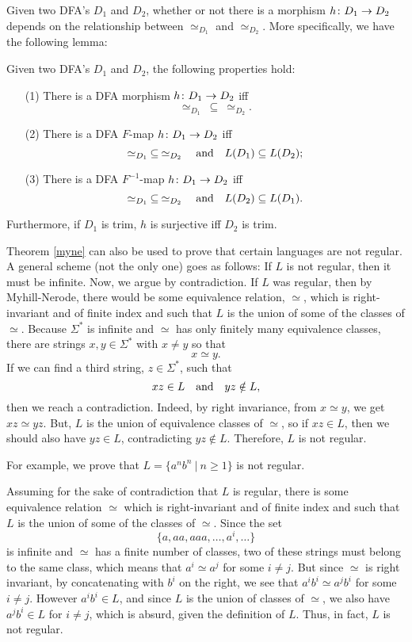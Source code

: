 \medskip
Given two DFA's $D_1$ and $D_2$, whether or not 
there is a morphism $h\colon D_1\rightarrow D_2$
depends on the relationship between
$\simeq_{D_1}$ and $\simeq_{D_2}$.
More specifically, we have the following lemma:

\begin{lemma}
\label{existmorph}
Given two DFA's $D_1$ and $D_2$, the following
properties hold:
\begin{enumerate}
\item[(1)]
There is a DFA morphism $h\colon D_1\rightarrow D_2$
iff 
\[\simeq_{D_1}\>\subseteq\>\simeq_{D_2}.\]
\item[(2)]
There is a DFA $F$-map
$h\colon D_1\rightarrow D_2$ iff
\[\simeq_{D_1}\>\subseteq\> \simeq_{D_2}
\quad\hbox{and}\quad
L(D_1) \subseteq  L(D_2);\]
\item[(3)]
There is a DFA $F^{-1}$-map
$h\colon D_1\rightarrow D_2$ iff
\[\simeq_{D_1}\>\subseteq\> \simeq_{D_2}
\quad\hbox{and}\quad
L(D_2) \subseteq  L(D_1).\]
\end{enumerate}
Furthermore, if $D_1$ is trim, $h$ is surjective iff
$D_2$ is trim.
\end{lemma}


\medskip
Theorem \ref{myne} can also be used to prove that certain
languages are not regular. 
A general scheme (not the only one) goes as follows:
If $L$ is not regular, then it must be infinite. Now, we argue by 
contradiction.  If $L$ was regular, then by Myhill-Nerode,
there would be some equivalence relation, $\simeq$, which is right-invariant
and of finite index and such that $L$ is the union of some of the classes
of $\simeq$. Because $\Sigma^*$ is infinite and $\simeq$
has only finitely many equivalence classes, there are 
strings $x, y\in \Sigma^*$ with $x\not = y$ so that
\[
x \simeq y.
\]
If we can find a third string, $z\in\Sigma^*$, such that
\[
xz\in L\quad\hbox{and}\quad yz\notin L,
\]
then we reach a contradiction. Indeed, by right invariance, from
$x\simeq y$, we get $xz\simeq yz$. But, $L$ is the union of
equivalence classes of $\simeq$, so if $xz\in L$, then we should
also have $yz\in L$, contradicting $yz\notin L$.
Therefore, $L$ is not regular.

\medskip
For example, we prove that
$L = \{a^nb^n\ |\ n\geq 1\}$ is not regular.

\medskip
Assuming for the sake of contradiction that $L$ is regular,
there is some equivalence relation $\simeq$ which is right-invariant
and of finite index and such that $L$ is the union of some of the classes
of $\simeq$. Since the set
$$\{a, aa, aaa, \ldots, a^i, \ldots\}$$
is infinite and $\simeq$ has a finite number of classes,
two of these strings must belong to the same class, which means
that $a^i \simeq a^j$ for some $i\not= j$.
But since $\simeq$ is right invariant, by concatenating with
$b^i$ on the right, we see that $a^ib^i \simeq a^jb^i$ for some $i\not= j$.
However $a^ib^i\in L$, and since $L$ is the union of classes
of $\simeq$, we also have $a^jb^i\in L$ for  $i\not= j$,
which is absurd, given the definition of $L$. Thus, in fact,
$L$ is not regular.

